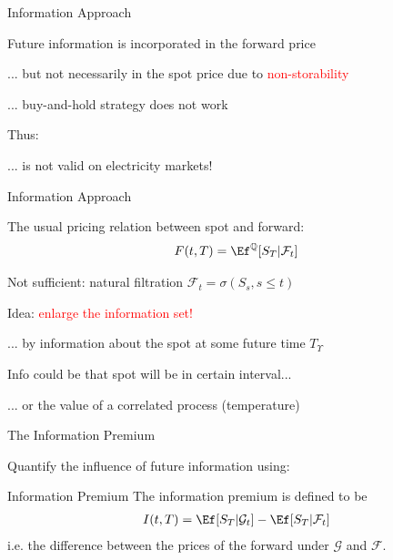 {Information Approach}
\vspace{-0.5cm}






	Future information is incorporated in the forward price

	... but not necessarily in the spot price due to \textcolor{red}{non-storability}

	... buy-and-hold strategy does not work
%

	Thus:






%

	... is not valid on electricity markets!

{Information Approach}
\vspace{-0.5cm}






	The usual pricing relation between spot and forward:
\begin{align*}
F(t,T)=\Ef^\mathbb{Q}[S_T|\mathcal{F}_t]
\end{align*}

	Not sufficient: natural filtration $\mathcal{F}_t = \sigma(S_s, s\leq t)$
\vspace{0.5cm}
\pause

	Idea: \textcolor{red}{enlarge the information set!}
\vspace{0.5cm}
\pause

	... by information about the spot at some future time $T_\Upsilon$

	Info could be that spot will be in certain interval...

	... or the value of a correlated process (temperature)






{The Information Premium}
\vspace{-0.5cm}






	Quantify the influence of future information using:






\begin{block}{Information Premium}
The information premium is defined to be
\begin{align*}
I(t,T) = \Ef[S_T | \mathcal{G}_t] - \Ef[S_T | \mathcal{F}_t]
\end{align*}
i.e. the difference between the prices of the forward under $\mathcal{G}$ and $\mathcal{F}$.
\end{block}
